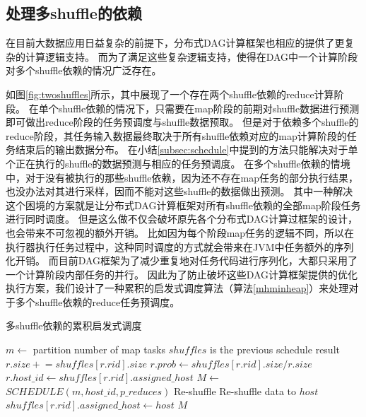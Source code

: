 \subsection{处理多shuffle的依赖}

在目前大数据应用日益复杂的前提下，分布式DAG计算框架也相应的提供了更复杂的计算逻辑支持。
而为了满足这些复杂逻辑支持，使得在DAG中一个计算阶段对多个shuffle依赖的情况广泛存在。

如图\ref{fig:twoshuffles}所示，其中展现了一个存在两个shuffle依赖的reduce计算阶段。
在单个shuffle依赖的情况下，只需要在map阶段的前期对shuffle数据进行预测即可做出reduce阶段的任务预调度与shuffle数据预取。
但是对于依赖多个shuffle的reduce阶段，其任务输入数据最终取决于所有shuffle依赖对应的map计算阶段的任务结束后的输出数据分布。
在小结\ref{subsec:schedule}中提到的方法只能解决对于单个正在执行的shuffle的数据预测与相应的任务预调度。
在多个shuffle依赖的情境中，对于没有被执行的那些shuffle依赖，因为还不存在map任务的部分执行结果，也没办法对其进行采样，因而不能对这些shuffle的数据做出预测。
其中一种解决这个困境的方案就是让分布式DAG计算框架对所有shuffle依赖的全部map阶段任务进行同时调度。
但是这么做不仅会破坏原先各个分布式DAG计算过框架的设计，也会带来不可忽视的额外开销。
比如因为每个阶段map任务的逻辑不同，所以在执行器执行任务过程中，这种同时调度的方式就会带来在JVM中任务额外的序列化开销。
而目前DAG框架为了减少重复地对任务代码进行序列化，大都只采用了一个计算阶段内部任务的并行。
因此为了防止破坏这些DAG计算框架提供的优化执行方案，我们设计了一种累积的启发式调度算法（算法\ref{mhminheap}）来处理对于多个shuffle依赖的reduce任务预调度。

\begin{algorithm}[H]
	\caption{多shuffle依赖的累积启发式调度}
	\label{mhminheap}
	\begin{algorithmic}[1]
		\small
			\State $m\gets$ partition number of map tasks
			\Comment $shuffles$ is the previous schedule result
				\State $r.size \mathrel{+}= shuffles\left[r.rid\right].size$
					\State $r.prob\gets shuffles\left[r.rid\right].size / r.size$
					\State $r.host\_id\gets shuffles\left[r.rid\right].assigned\_host$
				\EndIf
			\EndFor
			\State $M\gets$ $SCHEDULE\left(m, host\_id, p\_reduces\right)$
				\Comment Re-shuffle
					\State Re-shuffle data to $host$
					\State $shuffles\left[r.rid\right].assigned\_host\gets host$
					\EndIf
				\EndFor
			\EndFor
			\Return $M$
		\EndProcedure
	\end{algorithmic}
\end{algorithm}

